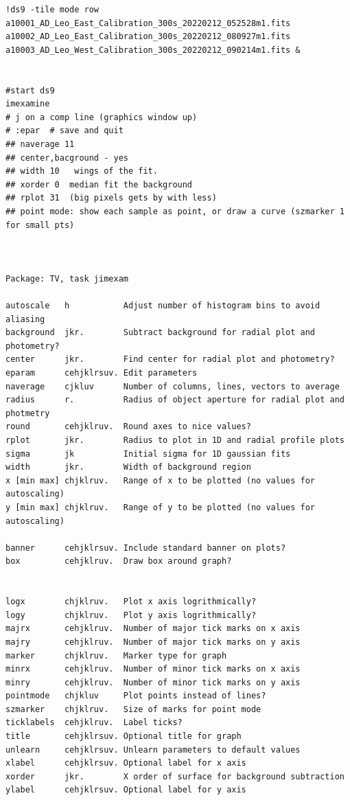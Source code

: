 \begingroup \fontsize{10pt}{10pt}
\selectfont
\begin{verbatim} 
!ds9 -tile mode row a10001_AD_Leo_East_Calibration_300s_20220212_052528m1.fits       a10002_AD_Leo_East_Calibration_300s_20220212_080927m1.fits a10003_AD_Leo_West_Calibration_300s_20220212_090214m1.fits &


#start ds9 
imexamine  
# j on a comp line (graphics window up)
# :epar  # save and quit
## naverage 11
## center,bacground - yes
## width 10   wings of the fit.
## xorder 0  median fit the background
## rplot 31  (big pixels gets by with less)
## point mode: show each sample as point, or draw a curve (szmarker 1 for small pts)



Package: TV, task jimexam

autoscale   h           Adjust number of histogram bins to avoid aliasing
background  jkr.        Subtract background for radial plot and photometry?
center      jkr.        Find center for radial plot and photometry?
eparam      cehjklrsuv. Edit parameters
naverage    cjkluv      Number of columns, lines, vectors to average
radius      r.          Radius of object aperture for radial plot and photmetry
round       cehjklruv.  Round axes to nice values?
rplot       jkr.        Radius to plot in 1D and radial profile plots
sigma       jk          Initial sigma for 1D gaussian fits
width       jkr.        Width of background region
x [min max] chjklruv.   Range of x to be plotted (no values for autoscaling)
y [min max] chjklruv.   Range of y to be plotted (no values for autoscaling)

banner      cehjklrsuv. Include standard banner on plots?
box         cehjklruv.  Draw box around graph?


logx        chjklruv.   Plot x axis logrithmically?
logy        chjklruv.   Plot y axis logrithmically?
majrx       cehjklruv.  Number of major tick marks on x axis
majry       cehjklruv.  Number of major tick marks on y axis
marker      chjklruv.   Marker type for graph
minrx       cehjklruv.  Number of minor tick marks on x axis
minry       cehjklruv.  Number of minor tick marks on y axis
pointmode   chjkluv     Plot points instead of lines?
szmarker    chjklruv.   Size of marks for point mode
ticklabels  cehjklruv.  Label ticks?
title       cehjklrsuv. Optional title for graph
unlearn     cehjklrsuv. Unlearn parameters to default values
xlabel      cehjklrsuv. Optional label for x axis
xorder      jkr.        X order of surface for background subtraction
ylabel      cehjklrsuv. Optional label for y axis
\end{verbatim}
\endgroup



